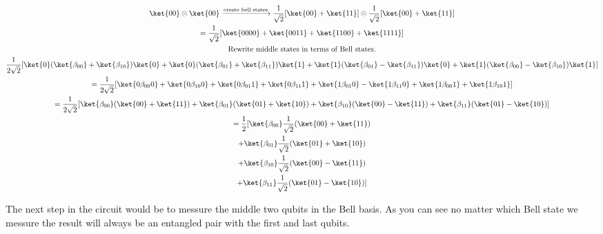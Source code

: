 \documentclass[]{article}
\begin{document}
\begin{enumerate}
  \begin{gather*}
    \ket{00} \otimes \ket{00} \xrightarrow{\text{create bell states}} \frac{1}{\sqrt{2}}[\ket{00} + \ket{11}] \otimes
    \frac{1}{\sqrt{2}}[\ket{00} + \ket{11}]\\ 
    = \frac{1}{\sqrt{2}}[\ket{0000} + \ket{0011} + \ket{1100} + \ket{1111}]\\
    \text{Rewrite middle states in terms of Bell states.}\\
    \frac{1}{2\sqrt{2}}[
    \ket{0}(\ket{\beta_{00}} + \ket{\beta_{10}})\ket{0}
    + \ket{0}(\ket{\beta_{01}} + \ket{\beta_{11}})\ket{1}
    + \ket{1}(\ket{\beta_{01}} - \ket{\beta_{11}})\ket{0}
    + \ket{1}(\ket{\beta_{00}} - \ket{\beta_{10}})\ket{1}
    ]\\
    = \frac{1}{2\sqrt{2}}[\ket{0\beta_{00}0} + \ket{0\beta_{10}0} + \ket{0\beta_{01}1} 
    + \ket{0\beta_{11}1} +\ket{1\beta_{01}0} - \ket{1\beta_{11}0} +\ket{1\beta_{00}1} 
    + \ket{1\beta_{10}1}]\\
    = \frac{1}{2\sqrt{2}}[\ket{\beta_{00}}(\ket{00} + \ket{11}) + \ket{\beta_{01}}(\ket{01} + \ket{10}) 
    + \ket{\beta_{10}}(\ket{00} - \ket{11}) + \ket{\beta_{11}}(\ket{01} - \ket{10})]\\
    = \frac{1}{2}[\ket{\beta_{00}}\frac{1}{\sqrt{2}}(\ket{00} + \ket{11}) \\
    + \ket{\beta_{01}}\frac{1}{\sqrt{2}}(\ket{01} + \ket{10})\\
    + \ket{\beta_{10}}\frac{1}{\sqrt{2}}(\ket{00} - \ket{11})\\
    + \ket{\beta_{11}}\frac{1}{\sqrt{2}}(\ket{01} - \ket{10})]\\
  \end{gather*}

  The next step in the circuit would be to messure the middle two qubits in the Bell basis. As you can see
  no matter which Bell state we messure the result will always be an entangled pair with the first and last
  qubits.

\end{enumerate}
\end{document}

